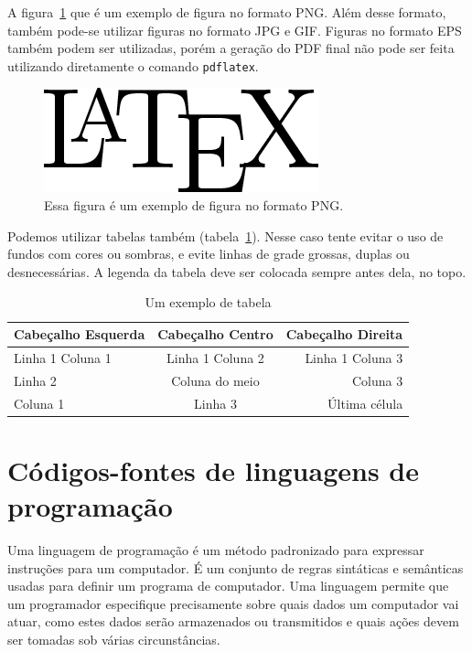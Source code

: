A figura~\ref{fig:exemplo_png} que é um exemplo de figura no formato PNG. Além desse formato, também pode-se utilizar figuras no formato JPG e GIF. Figuras no formato EPS também podem ser utilizadas, porém a geração do PDF final não pode ser feita utilizando diretamente o comando \texttt{pdflatex}.

\begin{figure}[htbp]
\centering
\includegraphics[width=.5\textwidth]{Figuras/latex-logo.png}
\caption{Essa figura é um exemplo de figura no formato PNG.}
\label{fig:exemplo_png}
\end{figure}

Podemos utilizar tabelas também (tabela~\ref{tab:exTabela}). Nesse caso tente evitar o uso de fundos com cores ou sombras, e evite linhas de grade grossas, duplas ou desnecessárias. A legenda da tabela deve ser colocada sempre antes dela, no topo.

\begin{table}[htbp]
\centering
\caption{Um exemplo de tabela}
\label{tab:exTabela}
\begin{tabular}{l|c|r} \hline
Cabeçalho Esquerda & Cabeçalho Centro & Cabeçalho Direita \\ 
\hline \hline
Linha 1 Coluna 1   & Linha 1 Coluna 2 & Linha 1 Coluna 3  \\
Linha 2            & Coluna do meio   & Coluna 3          \\
Coluna 1           & Linha 3          & Última célula     \\
\hline
\end{tabular}
\end{table}

\section{Códigos-fontes de linguagens de programação}

Uma linguagem de programação é um método padronizado para expressar instruções para um computador. É um conjunto de regras sintáticas e semânticas usadas para definir um programa de computador. Uma linguagem permite que um programador especifique precisamente sobre quais dados um computador vai atuar, como estes dados serão armazenados ou transmitidos e quais ações devem ser tomadas sob várias circunstâncias.

